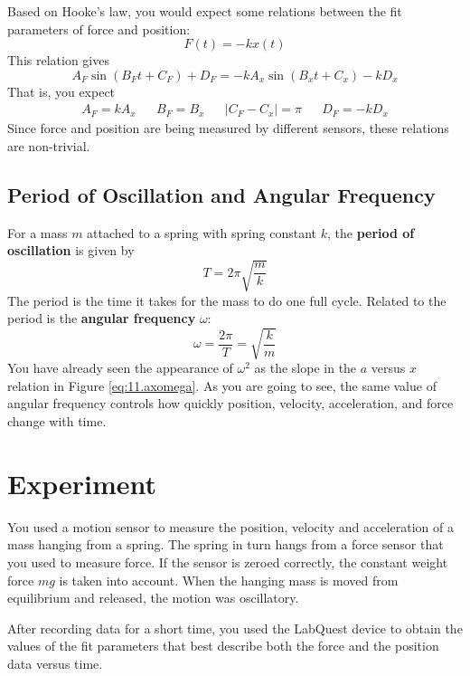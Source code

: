 Based on Hooke's law, you would expect some relations between the fit parameters of force and position:
\begin{equation}
    F(t) = - k x(t)
\end{equation}
This relation gives
\begin{equation}
    A_{F} \sin\left(B_{F} t + C_{F}\right) + D_{F} = -k A_{x} \sin\left( B_{x}t + C_{x} \right) - kD_{x}
\end{equation}
That is, you expect
\begin{align}
    A_{F} = kA_{x} && B_{F} = B_{x} && \vert C_{F} - C_{x} \vert = \pi && D_{F} = -kD_{x}
\end{align}
Since force and position are being measured by different sensors, these relations are non-trivial.
%
\subsection{Period of Oscillation and Angular Frequency}
%
For a mass $m$ attached to a spring with spring constant $k$, the \textbf{period of oscillation} is given by
\begin{equation}
    T = 2\pi \sqrt{\frac{m}{k}}
\end{equation}
The period is the time it takes for the mass to do one full cycle. Related to the period is the \textbf{angular frequency} $\omega$:
\begin{equation}
    \omega = \frac{2 \pi}{T} = \sqrt{\frac{k}{m}}
    \label{eq.11.omega}
\end{equation}
You have already seen the appearance of $\omega^{2}$ as the slope in the $a$ versus $x$ relation in Figure \ref{eq:11.axomega}. As you are going to see, the same value of angular frequency controls how quickly position, velocity, acceleration, and force change with time.
%
\section{Experiment}
%
You used a motion sensor to measure the position, velocity and acceleration of a mass hanging from a spring. The spring in turn hangs from a force sensor that you used to measure force. If the sensor is zeroed correctly, the constant weight force $mg$ is taken into account. When the hanging mass is moved from equilibrium and released, the motion was oscillatory.

After recording data for a short time, you used the LabQuest device to obtain the values of the fit parameters that best describe both the force and the position data versus time.

